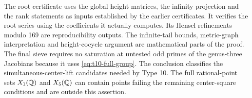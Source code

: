 The root certificate uses the global height matrices, the infinity
projection and the rank statements as inputs established by the earlier
certificates. It verifies the root series using the coefficients it
actually computes. Its Hensel refinements modulo 169 are reproducibility
outputs. The infinite-tail bounds, metric-graph interpretation and
height-cocycle argument are mathematical parts of the proof.
The final sieve requires no saturation at untested odd primes of the
genus-three Jacobians because it uses \eqref{eq:t10-full-group}.
The conclusion classifies the simultaneous-center-lift candidates
needed by Type 10. The full rational-point sets $X_1(\mathbb Q)$ and
$X_5(\mathbb Q)$ can contain points failing the remaining center-square
conditions and are outside this assertion.
